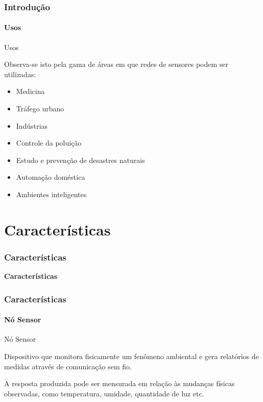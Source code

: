\documentclass[notes]{beamer}
\begin{document}
\begin{frame}
\label{slide_10}
\frametitle{Introdução}
\framesubtitle{Usos}

\begin{block}{Usos}

Observa-se isto pela gama de áreas em que redes de sensores podem ser utilizadas: \pause

\begin{itemize}

\item Medicina \pause
\item Tráfego urbano \pause
\item Indústrias \pause
\item Controle da poluição \pause
\item Estudo e prevenção de desastres naturais \pause
\item Automação doméstica \pause
\item Ambientes inteligentes 

\end{itemize}

\end{block}

\end{frame}

\section{Características}
\begin{frame}
\label{slide_11}
\frametitle{Características}

\begin{block}

 \center \textbf{Características}
 
\end{block}

\end{frame}

\begin{frame}
\label{slide_12}
\frametitle{Características}
\framesubtitle{Nó Sensor}

\begin{block}{Nó Sensor}

Dispositivo que monitora fisicamente um fenômeno ambiental e gera
relatórios de medidas através de comunicação sem
fio\cite{Clicia}.
\end{block}

\begin{block}

A resposta produzida pode ser mensurada em relação às mudanças físicas observadas, como temperatura, umidade, quantidade de luz etc.
\end{block}

\end{frame}
\end{document}

